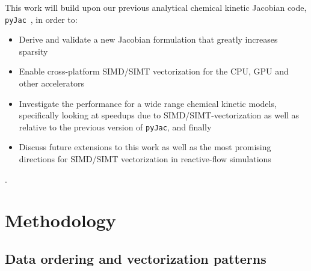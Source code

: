 \documentclass[12pt,number,sort&compress,preprint]{elsarticle}
\begin{document}
This work will build upon our previous analytical chemical kinetic Jacobian code, \texttt{pyJac}~\cite{Niemeyer:2016aa}, in order to:
\begin{itemize}
 \item Derive and validate a new Jacobian formulation that greatly increases sparsity
 \item Enable cross-platform SIMD\slash SIMT vectorization for the CPU, GPU and other accelerators
 \item Investigate the performance for a wide range chemical kinetic models, specifically looking at speedups due to SIMD\slash SIMT-vectorization as well as relative to the previous version of \texttt{pyJac}, and finally
 \item Discuss future extensions to this work as well as the most promising directions for SIMD\slash SIMT vectorization in reactive-flow simulations
\end{itemize}
.

\section{Methodology}
\subsection{Data ordering and vectorization patterns}
\label{S:data}
\end{document}
